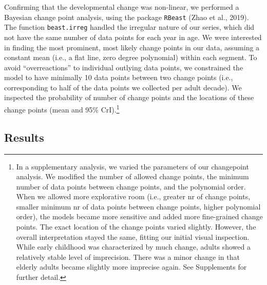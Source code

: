 \documentclass[
  man,mask,floatsintext]{apa6}
\begin{document}
Confirming that the developmental change was non-linear, we performed a Bayesian change point analysis, using the package \texttt{RBeast} (Zhao et al., 2019). The function \texttt{beast.irreg} handled the irregular nature of our series, which did not have the same number of data points for each year in age. We were interested in finding the most prominent, most likely change points in our data, assuming a constant mean (i.e., a flat line, zero degree polynomial) within each segment. To avoid ``overreactions'' to individual outlying data points, we constrained the model to have minimally 10 data points between two change points (i.e., corresponding to half of the data points we collected per adult decade). We inspected the probability of number of change points and the locations of these change points (mean and 95\% CrI).\footnote{In a supplementary analysis, we varied the parameters of our changepoint analysis. We modified the number of allowed change points, the minimum number of data points between change points, and the polynomial order. When we allowed more explorative room (i.e., greater nr of change points, smaller minimum nr of data points between change points, higher polynomial order), the models became more sensitive and added more fine-grained change points. The exact location of the change points varied slightly. However, the overall interpretation stayed the same, fitting our initial visual inspection. While early childhood was characterized by much change, adults showed a relatively stable level of imprecision. There was a minor change in that elderly adults became slightly more imprecise again. See Supplements for further detail.}

\hypertarget{results}{%
\subsection{Results}\label{results}}
\end{document}
